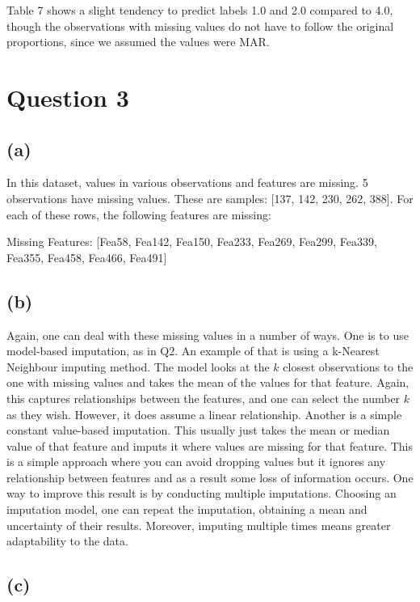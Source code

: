 \documentclass[12pt]{report} %
\begin{document}
Table 7 shows a slight tendency to predict labels 1.0 and 2.0 compared to 4.0, though the observations with missing values do not have to follow the original proportions, since we assumed the values were MAR.

\section*{Question 3}

\subsection*{(a)}

In this dataset, values in various observations and features are missing. 5 observations have missing values. These are samples: [137, 142, 230, 262, 388]. For each of these rows, the following features are missing:

\begin{center}
    Missing Features: [Fea58, Fea142, Fea150, Fea233, Fea269, Fea299, Fea339, Fea355, Fea458, Fea466, Fea491]
\end{center}

\subsection*{(b)}

Again, one can deal with these missing values in a number of ways.  
One is to use model-based imputation, as in Q2. An example of that is using a k-Nearest Neighbour imputing method. The model looks at the $k$ closest observations to the one with missing values and takes the mean of the values for that feature. Again, this captures relationships between the features, and one can select the number $k$ as they wish. However, it does assume a linear relationship.  
Another is a simple constant value-based imputation. This usually just takes the mean or median value of that feature and imputs it where values are missing for that feature. This is a simple approach where you can avoid dropping values but it ignores any relationship between features and as a result some loss of information occurs.  
One way to improve this result is by conducting multiple imputations. Choosing an imputation model, one can repeat the imputation, obtaining a mean and uncertainty of their results. Moreover, imputing multiple times means greater adaptability to the data\cite{reiter2020}.

\subsection*{(c)}
\end{document}
